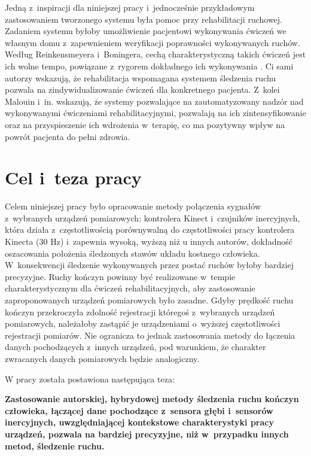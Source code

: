 Jedną z~inspiracji dla niniejszej pracy i~jednocześnie przykładowym zastosowaniem tworzonego systemu była pomoc przy rehabilitacji ruchowej. Zadaniem systemu byłoby umożliwienie pacjentowi wykonywania ćwiczeń we własnym domu z~zapewnieniem weryfikacji poprawności wykonywanych ruchów. Według Reinkensmeyera i~Boningera, cechą charakterystyczną takich ćwiczeń jest ich wolne tempo, powiązane z~rygorem dokładnego ich wykonywania  \cite{Reinkensmeyer2012}. Ci sami autorzy wskazują, że rehabilitacja wspomagana systemem śledzenia ruchu pozwala na zindywidualizowanie ćwiczeń dla konkretnego pacjenta. Z~kolei Malouin i~in. \cite{Malouin2003} wskazują, że systemy pozwalające na zautomatyzowany nadzór nad wykonywanymi ćwiczeniami rehabilitacyjnymi, pozwalają na ich zintensyfikowanie oraz na przyspieszenie ich wdrożenia w~terapię, co ma pozytywny wpływ na powrót pacjenta do pełni zdrowia.

\section{Cel i~teza pracy}
Celem niniejszej pracy było opracowanie metody połączenia sygnałów z~wybranych urządzeń pomiarowych: kontrolera Kinect i~czujników inercyjnych, która działa z~częstotliwością porównywalną do częstotliwości pracy kontrolera Kinecta (30 Hz) i~zapewnia wysoką, wyższą niż u innych autorów, dokładność oszacowania położenia śledzonych stawów układu kostnego człowieka. W~konsekwencji śledzenie wykonywanych przez postać ruchów byłoby bardziej precyzyjne. Ruchy kończyn powinny być realizowane w~tempie charakterystycznym dla ćwiczeń rehabilitacyjnych, aby zastosowanie zaproponowanych urządzeń pomiarowych było zasadne. Gdyby prędkość ruchu kończyn przekroczyła zdolność rejestracji któregoś z~wybranych urządzeń pomiarowych, należałoby zastąpić je urządzeniami o~wyższej częstotliwości rejestracji pomiarów. Nie ogranicza to jednak zastosowania metody do łączenia danych pochodzących z~innych urządzeń, pod warunkiem, że charakter zwracanych danych pomiarowych będzie analogiczny. 

W pracy została postawiona następująca teza:\\
\begin{center}
	\textbf{Zastosowanie autorskiej, hybrydowej metody śledzenia ruchu kończyn człowieka, łączącej dane pochodzące z~sensora głębi i~sensorów inercyjnych, uwzględniającej kontekstowe charakterystyki pracy urządzeń, pozwala na bardziej precyzyjne, niż w~przypadku innych metod, śledzenie ruchu.}
\end{center}

